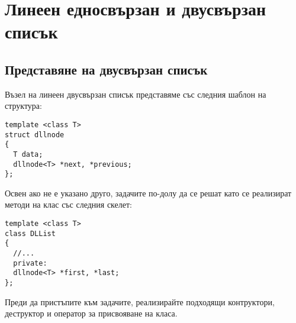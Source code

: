 \clearpage\section {Линеен едносвързан и двусвързан списък}

\subsection {Представяне на двусвързан списък}

\begin{mdframed}[hidealllines=true,backgroundcolor=gray!20]
Възел на линеен двусвързан списък представяме със следния шаблон на структура:
\begin{verbatim}
template <class T>
struct dllnode
{
  T data;
  dllnode<T> *next, *previous;
};
\end{verbatim}
Освен ако не е указано друго, задачите по-долу да се решат като се реализират методи на клас  със следния скелет:
\begin{verbatim}
template <class T>
class DLList
{
  //...
  private:
  dllnode<T> *first, *last;
};
\end{verbatim}
Преди да пристъпите към задачите, реализирайте подходящи контруктори, деструктор и оператор за присвояване на класа.
\end{mdframed}


